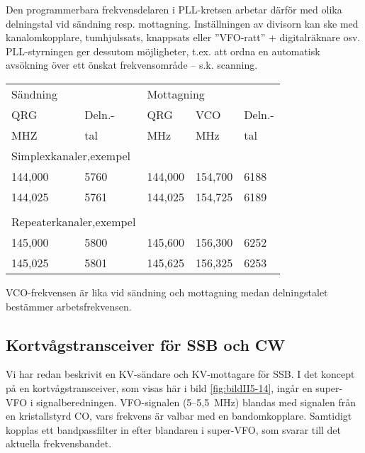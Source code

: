 Den programmerbara frekvensdelaren i PLL-kretsen arbetar därför med
olika delningstal vid sändning resp. mottagning.
Inställningen av divisorn kan ske med kanalomkopplare, tumhjulssats,
knappsats eller ''VFO-ratt'' + digitalräknare osv.
PLL-styrningen ger dessutom möjligheter, t.ex. att ordna en automatisk
avsökning över ett önskat frekvensområde -- s.k. scanning.

\begin{table}[ht]
\begin{center}
  \begin{tabular}{ll|lll}
    \multicolumn{2}{l|}{Sändning} &
    \multicolumn{3}{l}{Mottagning} \\
    QRG & Deln.- & QRG & VCO & Deln.- \\
    MHZ & tal    & MHz & MHz & tal \\
    \hline
    \multicolumn{2}{l|}{Simplexkanaler,exempel} & & & \\
    144,000 & 5760 & 144,000 & 154,700 & 6188 \\
    144,025 & 5761 & 144,025 & 154,725 & 6189 \\
    & & & & \\
    \multicolumn{2}{l|}{Repeaterkanaler,exempel} & & & \\
    145,000 & 5800 & 145,600 & 156,300 & 6252 \\
    145,025 & 5801 & 145,625 & 156,325 & 6253 \\
  \end{tabular}
\end{center}
\end{table}

VCO-frekvensen är lika vid sändning och mottagning medan delningstalet
bestämmer arbetsfrekvensen.

\subsection{Kortvågstransceiver för SSB och CW}

Vi har redan beskrivit en KV-sändare och KV-mottagare för SSB.
I det koncept på en kortvågstransceiver, som visas här i
bild \ref{fig:bildII5-14}, ingår en super-VFO i signalberedningen.
VFO-signalen (5--5,5~MHz) blandas med signalen från en kristallstyrd CO,
vars frekvens är valbar med en bandomkopplare.
Samtidigt kopplas ett bandpassfilter in efter blandaren i super-VFO,
som svarar till det aktuella frekvensbandet.

